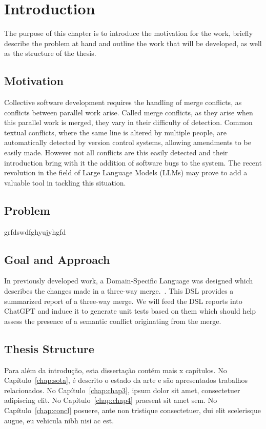 \chapter{Introduction} \label{chap:intro}

The purpose of this chapter is to introduce the motivation for the work, briefly describe the problem at hand and outline the work that will be developed, as well as the structure of the thesis.

\section{Motivation} \label{sec:motivation}

Collective software development requires the handling of merge conflicts, as conflicts between parallel work arise. Called merge conflicts, as they arise when this parallel work is merged, they vary in their difficulty of detection.
Common textual conflicts, where the same line is altered by multiple people, are automatically detected by version control systems, allowing amendments to be easily made. However not all conflicts are this easily detected and their introduction bring with it the addition of software bugs to the system.
The recent revolution in the field of Large Language Models (LLMs) may prove to add a valuable tool in tackling this situation.


\section{Problem} \label{sec:problem}

grfdswdfghyujyhgfd


\section{Goal and Approach} \label{sec:approach}

In previously developed work, a Domain-Specific Language was designed which describes the changes made in a three-way merge.~\citep{kn:nuno}. This DSL provides a summarized report of a three-way merge. We will feed the DSL reports into ChatGPT and induce it to generate unit tests based on them which should help assess the presence of a semantic conflict originating from the merge.






\section{Thesis Structure} \label{sec:struct}

Para além da introdução, esta dissertação contém mais x capítulos.
No Capítulo~\ref{chap:sota}, é descrito o estado da arte e são
apresentados trabalhos relacionados. 
No Capítulo~\ref{chap:chap3}, ipsum dolor sit amet, consectetuer
adipiscing elit.
No Capítulo~\ref{chap:chap4} praesent sit amet sem. 
No Capítulo~\ref{chap:concl} posuere, ante non tristique
consectetuer, dui elit scelerisque augue, eu vehicula nibh nisi ac
est. 
